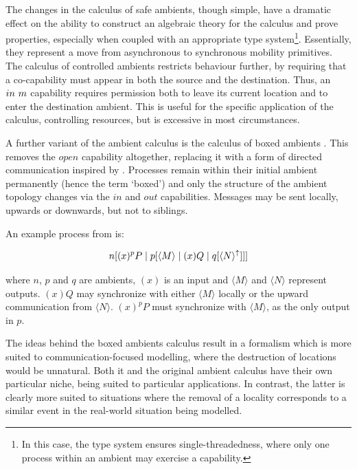 The changes in the calculus of safe ambients, though simple, have a
dramatic effect on the ability to construct an algebraic theory for
the calculus and prove properties, especially when coupled with an
appropriate type system\footnote{In this case, the type system ensures
  single-threadedness, where only one process within an ambient may
  exercise a capability.}.  Essentially, they represent a move from
asynchronous to synchronous mobility primitives.  The calculus of
controlled ambients \cite{controlledamb02} restricts behaviour
further, by requiring that a co-capability must appear in both the
source and the destination.  Thus, an $in\ m$ capability requires
permission both to leave its current location and to enter the
destination ambient. This is useful for the specific application of
the calculus, controlling resources, but is excessive in most
circumstances.

A further variant of the ambient calculus is the calculus of boxed
ambients \cite{boxedamb01}.  This removes the $open$ capability
altogether, replacing it with a form of directed communication inspired
by \cite{seal}.  Processes remain within their initial ambient
permanently (hence the term `boxed') and only the structure of the
ambient topology changes via the $in$ and $out$ capabilities.  Messages
may be sent locally, upwards or downwards, but not to siblings.

An example process from \cite{boxedamb01} is:

\begin{equation}
n[(x)^pP \;|\; p[\langle M \rangle \;|\; (x)Q \;|\; q[\langle N
\rangle^\uparrow ]]]
\end{equation}

\noindent where $n$, $p$ and $q$ are ambients, $(x)$ is an input and
$\langle M \rangle$ and $\langle N \rangle$ represent outputs.  $(x)Q$
may synchronize with either $\langle M \rangle$ locally or the upward
communication from $\langle N \rangle$.  $(x)^pP$ must synchronize with
$\langle M \rangle$, as the only output in $p$.

The ideas behind the boxed ambients calculus result in a formalism which
is more suited to communication-focused modelling, where the destruction
of locations would be unnatural.  Both it and the original ambient
calculus have their own particular niche, being suited to particular
applications.  In contrast, the latter is clearly more suited to
situations where the removal of a locality corresponds to a similar
event in the real-world situation being modelled.


